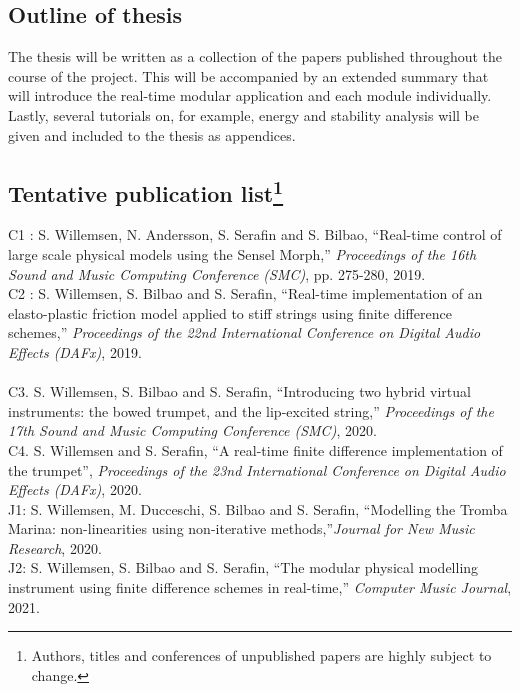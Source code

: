 \subsection{Outline of thesis}
The thesis will be written as a collection of the papers published throughout the course of the project. This will be accompanied by an extended summary that will introduce the real-time modular application and each module individually. Lastly, several tutorials on, for example, energy and stability analysis will be given and included to the thesis as appendices. 

\subsection{Tentative publication list\protect\footnote{Authors, titles and conferences of unpublished papers are highly subject to change.}}
C1 \cite{Willemsen2019a}: S. Willemsen, N. Andersson, S. Serafin and S. Bilbao, ``Real-time control of large scale physical models using the Sensel Morph,'' \textit{Proceedings of the 16th Sound and Music Computing Conference (SMC)}, pp. 275-280, 2019.
\vspace{0.15cm}
\\
C2 \cite{Willemsen2019b}: S. Willemsen, S. Bilbao and S. Serafin, ``Real-time implementation of an elasto-plastic friction model applied to stiff strings using finite difference schemes,'' \textit{Proceedings of the 22nd International Conference on Digital Audio Effects (DAFx)}, 2019.
\vspace{0.15cm}
\\
\vspace{0.15cm}
\\
C3. S. Willemsen, S. Bilbao and S. Serafin, ``Introducing two hybrid virtual instruments: the bowed trumpet, and the lip-excited string,'' \textit{Proceedings of the 17th Sound and Music Computing Conference (SMC)}, 2020.
\vspace{0.15cm}
\\
C4. S. Willemsen and S. Serafin, ``A real-time finite difference implementation of the trumpet'', \textit{Proceedings of the 23nd International Conference on Digital Audio Effects (DAFx)}, 2020.
\vspace{0.15cm}
\\
J1: S. Willemsen, M. Ducceschi, S. Bilbao and S. Serafin, ``Modelling the Tromba Marina: non-linearities using non-iterative methods,''\textit{Journal for New Music Research}, 2020.
\vspace{0.15cm}
\\
J2: S. Willemsen, S. Bilbao and S. Serafin, ``The modular physical modelling instrument using finite difference schemes in real-time,'' \textit{Computer Music Journal}, 2021.

